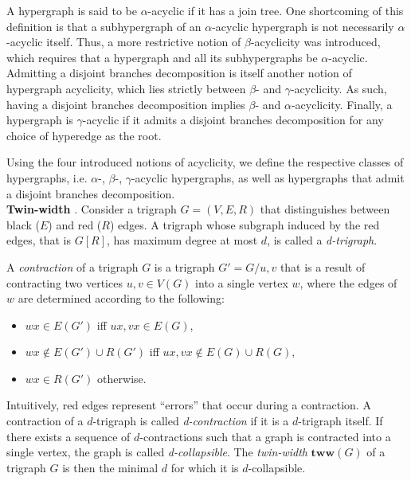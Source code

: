 \documentclass{article}
\begin{document}
A hypergraph is said to be $\alpha$-acyclic if it has a join tree.
One shortcoming of this definition is that a subhypergraph of an $\alpha$-acyclic hypergraph is not necessarily $\alpha$-acyclic itself.
Thus, a more restrictive notion of $\beta$-acyclicity was introduced, which requires that a hypergraph and all its subhypergraphs be $\alpha$-acyclic.
Admitting a disjoint branches decomposition is itself another notion of hypergraph acyclicity, which lies strictly between $\beta$- and $\gamma$-acyclicity.
As such, having a disjoint branches decomposition implies $\beta$- and $\alpha$-acyclicity.
Finally, a hypergraph is $\gamma$-acyclic if it admits a disjoint branches decomposition for any choice of hyperedge as the root.

Using the four introduced notions of acyclicity, we define the respective classes of hypergraphs, i.e. $\alpha$-, $\beta$-, $\gamma$-acyclic hypergraphs, as well as hypergraphs that admit a disjoint branches decomposition. \\

\noindent
\textbf{Twin-width} \cite{DBLP:conf/sat/GanianPSSS22}.
Consider a trigraph $G=(V,E,R)$ that distinguishes between black ($E$) and red ($R$) edges.
A trigraph whose subgraph induced by the red edges, that is $G[R]$, has maximum degree at most $d$, is called a {\em d-trigraph}.

A {\em contraction} of a trigraph $G$ is a trigraph $G'=G/u,v$ that is a result of contracting two vertices $u,v \in V(G)$ into a single vertex $w$, where the edges of $w$ are determined according to the following:
\begin{itemize}[--]
	\item $wx \in E(G')$ iff $ux, vx \in E(G)$,
	\item $wx \not\in E(G') \cup R(G')$ iff $ux, vx \not\in E(G)\cup R(G),$
	\item $wx \in R(G')$ otherwise.
\end{itemize}
Intuitively, red edges represent ``errors'' that occur during a contraction.
A contraction of a $d$-trigraph is called {\em d-contraction} if it is a $d$-trigraph itself.
If there exists a sequence of $d$-contractions such that a graph is contracted into a single vertex, the graph is called {\em d-collapsible}.
The {\em twin-width} $\textbf{tww}(G)$ of a trigraph $G$ is then the minimal $d$ for which it is $d$-collapsible. \\

%
%
\end{document}
